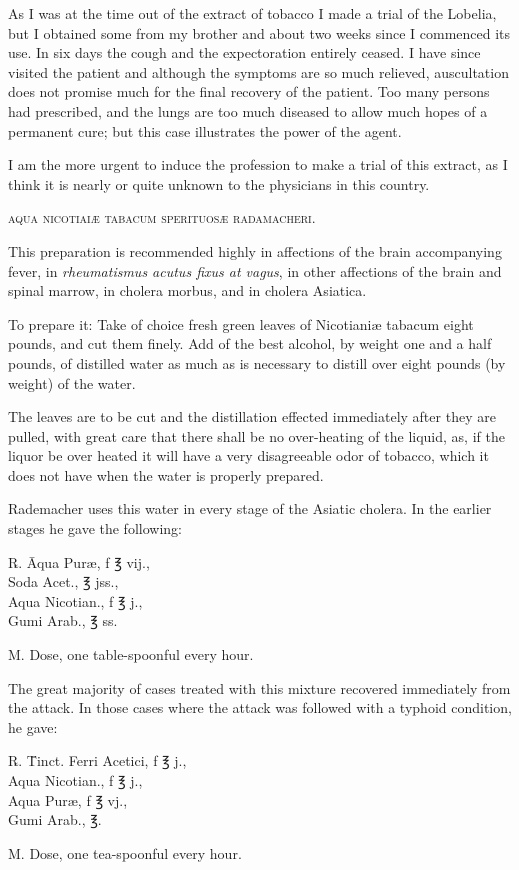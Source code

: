 
As I was at the time out of the extract of tobacco I made a trial of
the Lobelia, but I obtained some from my brother and about two
weeks since I commenced its use. In six days the cough and the expectoration
entirely ceased. I have since visited the patient and although
the symptoms are so much relieved, auscultation does not promise much
for the final recovery of the patient. Too many persons had prescribed,
and the lungs are too much diseased to allow much hopes of a permanent
cure; but this case illustrates the power of the agent.

I am the more urgent to induce the profession to make a trial of
this extract, as I think it is nearly or quite unknown to the physicians
in this country.

\begin{center}\textsc{aqua nicotiaiæ tabacum sperituosæ radamacheri.}\end{center}

This preparation is recommended highly in affections of the brain
accompanying fever, in \emph{rheumatismus acutus fixus at vagus}, in other
affections of the brain and spinal marrow, in cholera morbus, and in
cholera Asiatica.

To prepare it: Take of choice fresh green leaves of Nicotianiæ tabacum
eight pounds, and cut them finely. Add of the best alcohol,
by weight one and a half pounds, of distilled water as much as is
necessary to distill over eight pounds (by weight) of the water.

The leaves are to be cut and the distillation effected immediately
after they are pulled, with great care that there shall be no over-heating
of the liquid, as, if the liquor be over heated it will have a very disagreeable
odor of tobacco, which it does not have when the water is
properly prepared.

Rademacher uses this water in every stage of the Asiatic cholera.
In the earlier stages he gave the following:
  \begin{tabbing}
    \textsf{℞}. \= Aqua Puræ, f \textsf{℥} vij., \\
      \> Soda Acet., \textsf{℥} jss., \\
      \> Aqua Nicotian., f \textsf{℥} j., \\
      \> Gumi Arab., \textsf{℥} ss. \\
  \end{tabbing}
M. Dose, one table-spoonful every hour.


The great majority of cases treated with this mixture recovered
immediately from the attack. In those cases where the attack was followed
with a typhoid condition, he gave:
  \begin{tabbing}
    \textsf{℞}. \= Tinct. Ferri Acetici, f \textsf{℥} j., \\
      \> Aqua Nicotian., f \textsf{℥} j., \\
      \> Aqua Puræ, f \textsf{℥} vj., \\
      \> Gumi Arab., \textsf{℥}. \\
  \end{tabbing}
M. Dose, one tea-spoonful every hour.
\endinput

